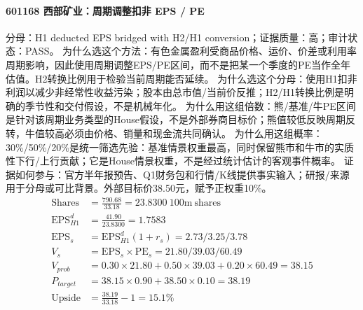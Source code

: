 \paragraph{601168 西部矿业：周期调整扣非 EPS / PE}
分母：H1 deducted EPS bridged with H2/H1 conversion；证据质量：高；审计状态：PASS。
为什么选这个方法：有色金属盈利受商品价格、运价、价差或利用率周期影响，因此使用周期调整EPS/PE区间，而不是把某一个季度的PE当作全年估值。H2转换比例用于检验当前周期能否延续。
为什么选这个分母：使用H1扣非利润以减少非经常性收益污染；股本由总市值/当前价反推；H2/H1转换比例是明确的季节性和交付假设，不是机械年化。
为什么用这组倍数：熊/基准/牛PE区间是针对该周期业务类型的House假设，不是外部券商目标价；熊值较低反映周期反转，牛值较高必须由价格、销量和现金流共同确认。
为什么用这组概率：30\%/50\%/20\%是统一筛选先验：基准情景权重最高，同时保留熊市和牛市的实质性下行/上行贡献；它是House情景权重，不是经过统计估计的客观事件概率。
证据如何参与：官方半年报预告、Q1财务包和行情/K线提供事实输入；研报/来源用于分母或可比背景。外部目标价38.50元，赋予正权重10\%。
\begin{align*}
\mathrm{Shares} &= \frac{790.68}{33.18}=23.8300\ \mathrm{100m\ shares}\\
\mathrm{EPS}_{H1}^d &= \frac{41.90}{23.8300}=1.7583\\
\mathrm{EPS}_s &= \mathrm{EPS}_{H1}^d(1+r_s)=2.73/3.25/3.78\\
V_s &= \mathrm{EPS}_s\times \mathrm{PE}_s=21.80/39.03/60.49\\
V_{prob} &= 0.30\times 21.80+0.50\times 39.03+0.20\times 60.49=38.15\\
P_{target} &= 38.15\times 0.90+38.50\times 0.10=38.19\\
\mathrm{Upside} &= \frac{38.19}{33.18}-1=15.1\%\\
\end{align*}

